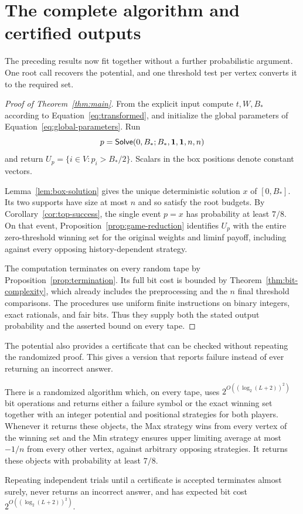 \section{The complete algorithm and certified outputs}\label{sec:completion}

The preceding results now fit together without a further probabilistic
argument. One root call recovers the potential, and one threshold test
per vertex converts it to the required set.

\begin{proof}[Proof of Theorem~\ref{thm:main}]
From the explicit input compute $t,W,B_*$ according to
Equation~\eqref{eq:transformed}, and initialize the global parameters
of Equation~\eqref{eq:global-parameters}. Run
\[
 p=\mathsf{Solve}(0,B_*;B_*,\boldsymbol1,\boldsymbol1,n,n)
\]
and return $U_p=\{i\in V:p_i>B_*/2\}$. Scalars in the box positions
denote constant vectors.

Lemma~\ref{lem:box-solution} gives the unique deterministic solution
$x$ of $[0,B_*]$. Its two supports have size at most $n$ and so satisfy
the root budgets. By Corollary~\ref{cor:top-success}, the single event
$p=x$ has probability at least $7/8$. On that event,
Proposition~\ref{prop:game-reduction} identifies $U_p$ with the entire
zero-threshold winning set for the original weights and liminf payoff,
including against every opposing history-dependent strategy.

The computation terminates on every random tape by
Proposition~\ref{prop:termination}. Its full bit cost is bounded by
Theorem~\ref{thm:bit-complexity}, which already includes the
preprocessing and the $n$ final threshold comparisons. The procedures
use uniform finite instructions on binary integers, exact rationals,
and fair bits. Thus they supply both the stated output probability and
the asserted bound on every tape.
\end{proof}


The potential also provides a certificate that can be checked without
repeating the randomized proof. This gives a version that reports failure
instead of ever returning an incorrect answer.

\begin{corollary}
\label{cor:certified-output}
There is a randomized algorithm which, on every tape, uses
$2^{O((\log_2(L+2))^2)}$ bit operations and returns either a failure
symbol or the exact winning set together with an integer potential and
positional strategies for both players. Whenever it returns these
objects, the Max strategy wins from every vertex of the winning set and
the Min strategy ensures upper limiting average at most $-1/n$ from
every other vertex, against arbitrary opposing strategies. It returns
these objects with probability at least $7/8$.

Repeating independent trials until a certificate is accepted terminates
almost surely, never returns an incorrect answer, and has expected bit
cost $2^{O((\log_2(L+2))^2)}$.
\end{corollary}

